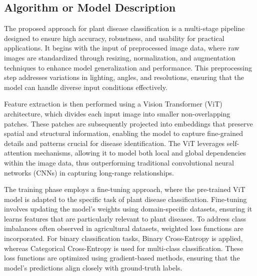 \subsection{Algorithm or Model Description}





The proposed approach for plant disease classification is a multi-stage pipeline designed to ensure high accuracy, robustness, and usability for practical applications. It begins with the input of preprocessed image data, where raw images are standardized through resizing, normalization, and augmentation techniques to enhance model generalization and performance. This preprocessing step addresses variations in lighting, angles, and resolutions, ensuring that the model can handle diverse input conditions effectively.  

Feature extraction is then performed using a Vision Transformer (ViT) architecture, which divides each input image into smaller non-overlapping patches. These patches are subsequently projected into embeddings that preserve spatial and structural information, enabling the model to capture fine-grained details and patterns crucial for disease identification. The ViT leverages self-attention mechanisms, allowing it to model both local and global dependencies within the image data, thus outperforming traditional convolutional neural networks (CNNs) in capturing long-range relationships.  

The training phase employs a fine-tuning approach, where the pre-trained ViT model is adapted to the specific task of plant disease classification. Fine-tuning involves updating the model’s weights using domain-specific datasets, ensuring it learns features that are particularly relevant to plant diseases. To address class imbalances often observed in agricultural datasets, weighted loss functions are incorporated. For binary classification tasks, Binary Cross-Entropy is applied, whereas Categorical Cross-Entropy is used for multi-class classification. These loss functions are optimized using gradient-based methods, ensuring that the model’s predictions align closely with ground-truth labels.  

